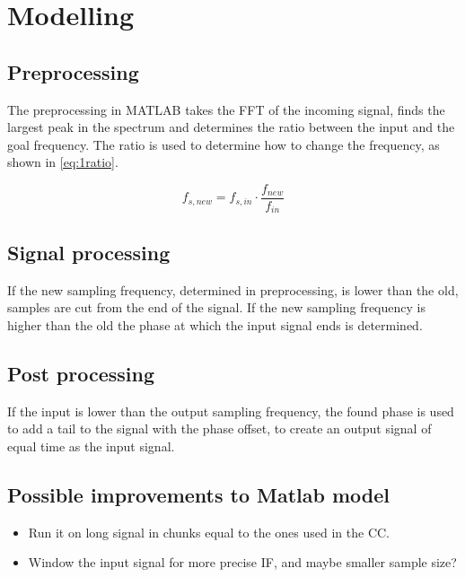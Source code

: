 
\section{Modelling}
\label{sec:PureSineModelling}
\subsection{Preprocessing}
The preprocessing in MATLAB takes the FFT of the incoming signal, finds the largest peak in the spectrum and determines the ratio between the input and the goal frequency.
The ratio is used to determine how to change the frequency, as shown in \cref{eq:1ratio}.

\begin{equation}
	f_{s,new} = f_{s,in}\cdot\frac{f_{new}}{f_{in}}
	\label{eq:1ratio}
\end{equation}

\subsection{Signal processing}
If the new sampling frequency, determined in preprocessing, is lower than the old, samples are cut from the end of the signal. 
If the new sampling frequency is higher than the old the phase at which the input signal ends is determined.

\subsection{Post processing}
If the input is lower than the output sampling frequency, the found phase is used to add a tail to the signal with the phase offset, to create an output signal of equal time as the input signal.

\subsection{Possible improvements to Matlab model}
\begin{itemize}
	\item Run it on long signal in chunks equal to the ones used in the CC.
	\item Window the input signal for more precise IF, and maybe smaller sample size?
\end{itemize}

\FloatBarrier